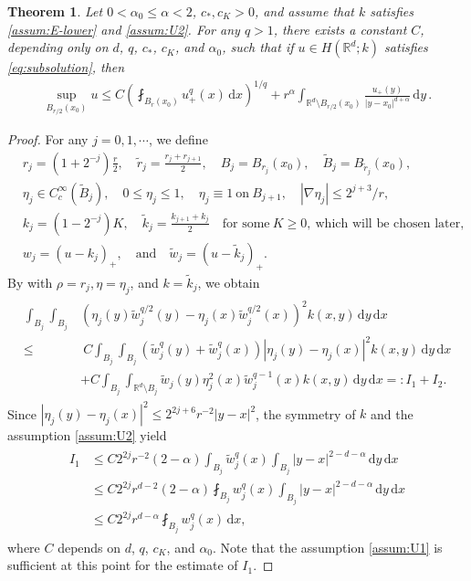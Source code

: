\documentclass[reqno]{amsart}
\theoremstyle{plain}
\newtheorem{theorem}{Theorem}[section]
\theoremstyle{definition}
\numberwithin{equation}{section}
\newcommand{\Rd}{\mathbb{R}^d}
\newcommand{\dx} {\, \mathrm{d}x}
\newcommand{\dy} {\, \mathrm{d}y}
\newcommand{\cl} {c_{\ast}}
\newcommand{\cK} {c_K}
\begin{document}
\begin{theorem} \label{theo:local boundedness}
Let $0 < \alpha_0 \leq \alpha < 2$, $\cl, \cK > 0$, and assume that $k$ satisfies \eqref{assum:E-lower} and \eqref{assum:U2}. For any $q > 1$, there exists a constant $C$, depending only on $d$, $q$, $\cl$, $\cK$, and $\alpha_0$, such that if $u \in H(\Rd; k)$ satisfies \eqref{eq:subsolution}, then 
\begin{align*}
\sup_{B_{r/2}(x_0)} u 
\leq C \left( \fint_{B_r(x_0)} u_+^q(x) \dx \right)^{1/q} 
+ r^\alpha \int_{\Rd \setminus B_{r/2}(x_0)} 
\frac{u_+(y)}{|y-x_0|^{d+\alpha}} \dy \,.
\end{align*}
\end{theorem}

\begin{proof}
For any $j = 0, 1, \cdots$, we define
\begin{align*}
&r_j = (1+2^{-j})\frac{r}{2}, \quad \tilde{r}_j = \frac{r_j+r_{j+1}}{2}, \quad 
B_j = B_{r_j}(x_0), \quad \tilde{B}_j = B_{\tilde{r}_j}(x_0), \\
&\eta_j \in C_c^\infty(\tilde{B}_j), \quad 0 \leq \eta_j \leq 1, \quad \eta_j \equiv 1
~\text{on}~ B_{j+1}, \quad |\nabla \eta_j| \leq 2^{j+3} / r, \\
&k_j = (1-2^{-j})K, \quad \tilde{k}_j = \frac{k_{j+1} + k_j}{2} \quad
\text{for some} ~ K \geq 0, ~ \text{which will be chosen later}, \\
&w_j = (u - k_j)_+, \quad \text{and} \quad \tilde{w}_j = (u - \tilde{k}_j)_+.
\end{align*}
By  with $\rho = r_j, \eta = \eta_j$, and $k = \tilde{k}_j$, we obtain
\begin{align} \label{eq:I_1,I_2_LB}
\begin{split}
\int_{B_j} \int_{B_j} & \left( \eta_j(y) \tilde{w}_j^{q/2}(y) 
- \eta_j(x) \tilde{w}_j^{q/2}(x) \right)^2 k(x,y) \dy \dx \\
\leq&~ C \int_{B_j} \int_{B_j} \left( \tilde{w}_j^q(y) + \tilde{w}_j^q(x) \right) | \eta_j(y) 
- \eta_j(x) |^2 k(x,y) \dy \dx \\
&+ C \int_{B_j} \int_{\Rd \setminus B_j} \tilde{w}_j(y) \eta_j^2(x) \tilde{w}_j^{q-1}(x) 
k(x,y) \dy \dx =: I_1 + I_2.
\end{split}
\end{align}
Since $|\eta_j(y) - \eta_j(x)|^2 \leq 2^{2j+6} r^{-2} |y-x|^2$, the symmetry of $k$ and the assumption \eqref{assum:U2} yield
\begin{align} \label{eq:I_1_LB}
\begin{split}
I_1
&\leq C 2^{2j} r^{-2} (2-\alpha) \int_{B_j} \tilde{w}_j^q(x) \int_{B_j}  |y-x|^{2-d-\alpha} \dy \dx \\
&\leq C 2^{2j} r^{d-2} (2-\alpha) \fint_{B_j} w_j^q(x) \int_{B_j}  |y-x|^{2-d-\alpha} \dy \dx \\
&\leq C 2^{2j} r^{d-\alpha} \fint_{B_j} w_j^q(x) \dx,
\end{split}
\end{align}
where $C$ depends on $d$, $q$, $\cK$, and $\alpha_0$. Note that the assumption \eqref{assum:U1} is sufficient at this point for the estimate of $I_1$.


\end{proof}
\end{document}
